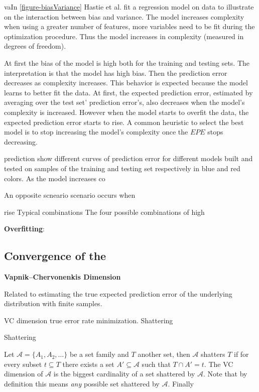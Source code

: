vaIn \ref{figure-biasVariance} Hastie et al. fit a regression model on data to illustrate on the interaction between bias and variance. The model increases complexity when using a greater number of features, more variables need to be fit during the optimization procedure. Thus the model increases in complexity (measured in degrees of freedom). 

At first the bias of the model is high both for the training and testing sets. The interpretation is that the model has high bias. Then the prediction error decreases as complexity increases. This behavior is expected because the model learns to better fit the data. At first, the expected prediction error, estimated by averaging over the test set' prediction error's, also decreases when the model's complexity is increased. However when the model starts to overfit the data, the expected prediction error starts to rise. A common heuristic to select the best model is to stop increasing the model's complexity once the $EPE$ stops decreasing.


prediction 
show different curves of prediction error for different models built and tested on samples of the training and testing set respectively in blue and red colors. As the model increases co

An opposite scneario scenario occurs when

rise Typical combinations
The four possible combinations of high 


\textbf{Overfitting}: 
 




\subsection{Convergence of the }
\textbf{Vapnik–Chervonenkis Dimension}
\cite{vapnik-nature2013}
\cite{cherkassky-learning2007}

Related to estimating the true expected prediction error of the underlying distribution with finite samples.

VC dimension true error rate minimization. 
Shattering
\begin{definition}{Shattering}

Let $\mathcal {A}= \{A_1,A_{2},\dots \}$ be a set family and $T$  another set, then $\mathcal {A}$ shatters $T$ if for every subset $t \subseteq T$ there exists a set $A' \subseteq \mathcal {A} $ such that $ T \cap A' = t$. The VC dimension of $\mathcal {A}$ is the biggest cardinality of a set shattered by $\mathcal {A}$. Note that by definition this means \textit{any} possible set shattered by $\mathcal {A}$. Finally
 \end{definition}



